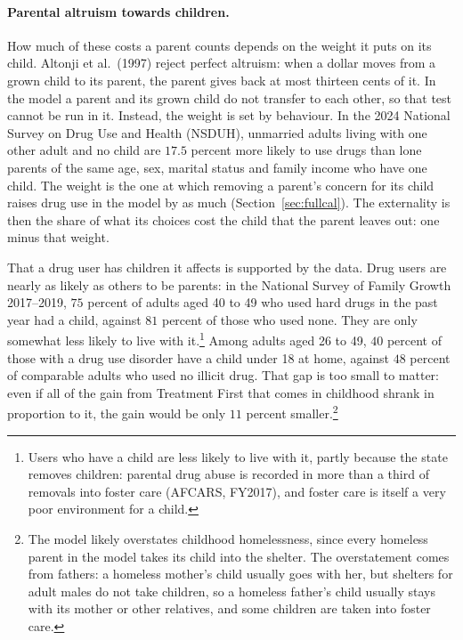 \documentclass[10pt]{article}
\begin{document}
\paragraph{Parental altruism towards children.} How much of these costs a parent counts depends on the weight it puts on its child. Altonji et al.\ (1997) reject perfect altruism: when a dollar moves from a grown child to its parent, the parent gives back at most thirteen cents of it. In the model a parent and its grown child do not transfer to each other, so that test cannot be run in it. Instead, the weight is set by behaviour. In the 2024 National Survey on Drug Use and Health (NSDUH), unmarried adults living with one other adult and no child are $17.5$ percent more likely to use drugs than lone parents of the same age, sex, marital status and family income who have one child. The weight is the one at which removing a parent's concern for its child raises drug use in the model by as much (Section~\ref{sec:fullcal}). The externality is then the share of what its choices cost the child that the parent leaves out: one minus that weight.

That a drug user has children it affects is supported by the data. Drug users are nearly as likely as others to be parents: in the National Survey of Family Growth 2017--2019, $75$ percent of adults aged 40 to 49 who used hard drugs in the past year had a child, against $81$ percent of those who used none. They are only somewhat less likely to live with it.\footnote{Users who have a child are less likely to live with it, partly because the state removes children: parental drug abuse is recorded in more than a third of removals into foster care (AFCARS, FY2017), and foster care is itself a very poor environment for a child.} Among adults aged 26 to 49, $40$ percent of those with a drug use disorder have a child under 18 at home, against $48$ percent of comparable adults who used no illicit drug. That gap is too small to matter: even if all of the gain from Treatment First that comes in childhood shrank in proportion to it, the gain would be only $11$ percent smaller.\footnote{The model likely overstates childhood homelessness, since every homeless parent in the model takes its child into the shelter. The overstatement comes from fathers: a homeless mother's child usually goes with her, but shelters for adult males do not take children, so a homeless father's child usually stays with its mother or other relatives, and some children are taken into foster care.}
\end{document}
